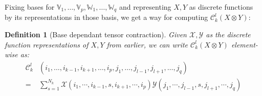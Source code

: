 \documentclass[11pt,a4paper,openright,oneside]{book}
\numberwithin{equation}{section}
\newtheorem{defn0}{Definition}[chapter]
\newenvironment{definition}{ \begin{defn0}}{\end{defn0}}
\begin{document}
Fixing bases for $\mathbb{V}_1, \dots, \mathbb{V}_p, \mathbb{W}_1, \dots, \mathbb{W}_q$ and representing $X, Y$
as discrete functions by its representations in those basis, we get a way for computing $\mathcal{C}_k^l(X \otimes Y)$:

\begin{definition}[Base dependant tensor contraction]
     Given $\mathcal{X}, \mathcal{Y}$ as the discrete function representations
    of $X, Y$ from earlier, we can write $\mathcal{C}_k^l(X \otimes Y)$ element-wise as:
    \begin{equation}
    \begin{align}\mathcal{C}_k^l & (i_1, \dots, i_{k-1}, i_{k+1}, \dots, i_p, j_1, \dots, j_{l-1}, j_{l+1}, \dots, j_q) \\  =& \sum_{s=1}^{N_k}
        \mathcal{X}(i_1, \cdots, i_{k-1}, s, i_{k+1}, \cdots, i_p) \mathcal{Y}(j_1, \cdots, j_{l-1}, s, j_{l+1}, \cdots, j_q)
\end{align}
\label{eq:contraction}
    \end{equation}
    \end{definition}
\end{document}
